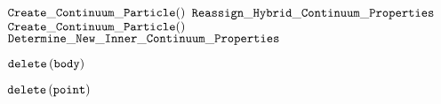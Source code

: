 \begin{algorithm}
\caption{${\tt Continuum \_ Avoid \_ a \_ Void}$}
\begin{algorithmic}[1]
      \State ${\tt Create \_ Continuum \_ Particle}()$
    \EndFor
    \State ${\tt Reassign \_ Hybrid \_ Continuum \_ Properties}$
  \EndFor
      \State ${\tt Create \_ Continuum \_ Particle}()$
    \EndFor
    \State ${\tt Determine \_ New \_ Inner \_ Continuum \_ Properties}$ 
  \EndFor
\end{algorithmic} \label{alg:continuum_avoid_a_void}
\end{algorithm}

\begin{algorithm}
  \caption{${\tt Delete \_ Discrete \_ Grains}$}
  \begin{algorithmic}[1]
      \State ${\tt delete} \left({\tt body}\right)$  
    \EndIf
  \EndFor
  \end{algorithmic}
  \label{alg:delete_discrete_grains}
\end{algorithm}

\begin{algorithm}
  \caption{${\tt Delete \_ Continuum \_ Particles}$}
  \begin{algorithmic}[1]
      \State ${\tt delete} \left({\tt point}\right)$  
    \EndIf
  \EndFor
  \end{algorithmic}
  \label{alg:delete_continuum_particles}
\end{algorithm}
